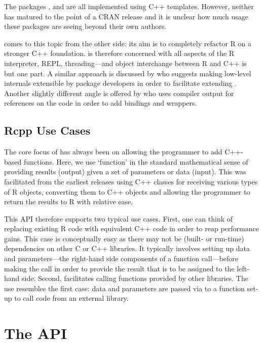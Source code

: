 The packages  \citep{liang08:rcppbind}, 
\citep{armstrong09:RAbstraction} and 
\citep{armstrong09:RObjects} are all implemented using C++ templates.
However, neither has matured to the point of a CRAN release and it is
unclear how much usage these packages are seeing beyond their own authors.

 \citep{runnalls09:cxxr} comes to this topic from the other side: 
its aim is to completely refactor R on a stronger C++ foundation. 
 is therefore concerned with all aspects of the R interpreter,
REPL, threading---and object interchange between R and C++ is but one
part. A similar approach is discussed by \cite{templelang09:modestproposal}
who suggests making low-level internals extensible by package developers in
order to facilitate extending \R.
%
Another slightly different angle is offered by
\cite{templelang09:rgcctranslationunit} who uses compiler output for
references on the code in order to add bindings and wrappers.

\subsection{Rcpp Use Cases} 
\label{sec:classic_rcpp}

The core focus of  has always been on allowing the 
programmer to add C++-based functions. 
Here, we use `function' in the standard mathematical sense of providing
results (output) given a set of parameters or data (input). 
This was
facilitated from the earliest releases using C++ classes for receiving
various types of R objects, converting them to C++ objects and allowing the
programmer to return the results to R with relative ease. 

This API therefore supports two typical use cases. First, one can think of
replacing existing R code with equivalent C++ code in order to reap
performance gains.  This case is conceptually easy as there may not be
(built- or run-time) dependencies on other C or C++ libraries.  It typically
involves setting up data and parameters---the right-hand side components of a
function call---before making the call in order to provide the result that is
to be assigned to the left-hand side. Second,  facilitates calling
functions provided by other libraries. The use resembles the first case: data
and parameters are passed via  to a function set-up to call code
from an external library.  

\section{The  API}
\label{sec:new_rcpp}

